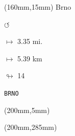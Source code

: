 \begin{textblock*}{40mm}(160mm,15mm)%
Brno
\par \Huge$\circlearrowleft$
\Large
\par$\mapsto$ 3.35 mi.
\par$\mapsto$ 5.39 km
\par$\looparrowright$ 14
\par\hfill\tiny\tt BRNO\\
\end{textblock*}
\begin{textblock*}{20mm}(200mm,5mm)%
\fbox{\thepage}
\end{textblock*}
\begin{textblock*}{20mm}(200mm,285mm)%
\fbox{\thepage}
\end{textblock*}
\null\newpage

